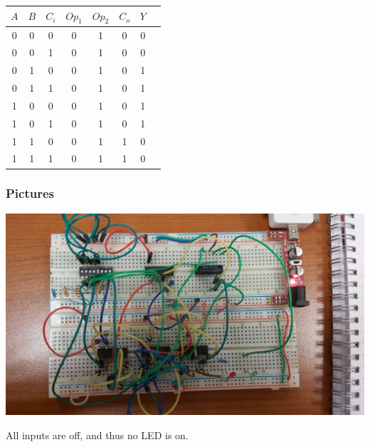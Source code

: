 \documentclass{article}
\begin{document}
\begin{center}
	\Large
	\begin{tabular}{c|c|c||c|c||c|c|c}
		$A$ & $B$ & $C_i$ & $Op_1$ & $Op_2$ & $C_{o}$ & $Y$ \\
		\hline
		0 & 0 & 0 & 0 & 1 & 0 & 0 \\
		0 & 0 & 1 & 0 & 1 & 0 & 0 \\
		0 & 1 & 0 & 0 & 1 & 0 & 1 \\
		0 & 1 & 1 & 0 & 1 & 0 & 1 \\
		1 & 0 & 0 & 0 & 1 & 0 & 1 \\
		1 & 0 & 1 & 0 & 1 & 0 & 1 \\
		1 & 1 & 0 & 0 & 1 & 1 & 0 \\
		1 & 1 & 1 & 0 & 1 & 1 & 0 \\
	\end{tabular}
\end{center}


\newpage

\subsubsection{Pictures}


\includegraphics[width=\textwidth]{./figures/00001.jpg}
\begin{center}
	All inputs are off, and thus no LED is on.
\end{center}

\vspace{2em}
\end{document}
